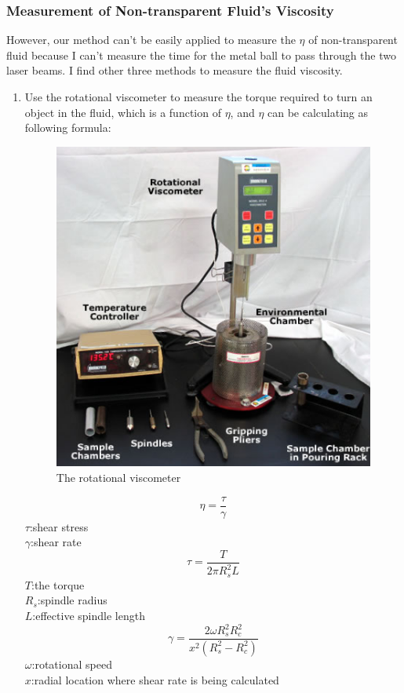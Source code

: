 \documentclass[12pt]{article}
\begin{document}
\subsubsection{Measurement of Non-transparent Fluid's Viscosity}
\par However, our method can't be easily applied to measure the $\eta$ of non-transparent fluid because I can't measure the time for the metal ball to pass through the two laser beams. I find other three methods to measure the fluid viscosity.
\begin{enumerate}
\item Use the rotational viscometer to measure the torque required to turn an object in the fluid, which is a function of $\eta$, and $\eta$ can be calculating as following formula:
\begin{figure}[H]
\centering
\includegraphics{P4.jpg}
\caption{The rotational viscometer}
\end{figure}
$$\eta=\frac{\tau}{\gamma}$$
{\centering \footnotesize  $\tau$:shear stress\\$\gamma$:shear rate\\
} 
$$\tau=\frac{T}{2\pi{R_s^2L}}$$
{\centering \footnotesize  $T$:the torque \\$R_s$:spindle radius\\$L$:effective spindle length\\} 
$$\gamma=\frac{2\omega{R_s^2R_c^2}}{x^2(R_s^2-R_c^2)}$$
{\centering \footnotesize  $\omega$:rotational speed \\$x$:radial location where shear rate is being calculated\\} 

\end{enumerate}
\end{document}
